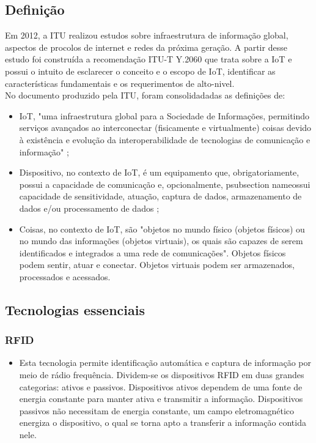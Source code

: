 \subsection{Definição}
	\quad Em 2012, a \acrfull{ITU} realizou estudos sobre infraestrutura
	de informação global, aspectos de procolos de internet e redes da próxima geração.
	A partir desse estudo foi construída a recomendação ITU-T Y.2060 \cite{ITU} que trata sobre a \acrlong{IoT}
	e possui o intuito de esclarecer o conceito e o escopo de \acrshort{IoT}, identificar
	as características fundamentais e os requerimentos de alto-nivel.
  \\ \null
  \quad	No documento produzido pela \acrshort{ITU}, foram consolidadadas as definições de:
	\begin{itemize}
		\item \acrlong{IoT}, "uma infraestrutura global para a Sociedade de Informações, permitindo serviços avançados ao
		interconectar (fisicamente e virtualmente) coisas devido à existência e evolução da interoperabilidade
	de tecnologias de comunicação e informação" \cite{ITU};
		\item Dispositivo, no contexto de \acrshort{IoT}, é um equipamento que, obrigatoriamente, possui a capacidade
		de comunicação e, opcionalmente, psubsection nameossui capacidade de sensitividade, atuação, captura de dados,
		armazenamento de dados e/ou processamento de dados \cite{ITU};
		\item Coisas, no contexto de \acrshort{IoT}, são "objetos
	no mundo físico (objetos físicos) ou no mundo das informações (objetos virtuais), os quais são capazes
	de serem identificados e integrados a uma rede de comunicações". Objetos físicos podem sentir, atuar e conectar.
	Objetos virtuais podem ser armazenados, processados e acessados.\cite{ITU}
	\end{itemize}
\subsection{Tecnologias essenciais}
	\subsubsection{\acrfull{RFID}}
		\begin{itemize}
			\item Esta tecnologia permite identificação automática e captura de informação por meio de rádio frequência.
			Dividem-se os dispositivos \acrshort{RFID} em duas grandes categorias: ativos e passivos. Dispositivos ativos dependem
			de uma fonte de energia constante para manter ativa e transmitir a informação. Dispositivos passivos não necessitam de energia constante,
			um campo eletromagnético energiza o dispositivo, o qual se torna apto a transferir a informação contida nele.
			\cite{refrfid}
		\end{itemize}
